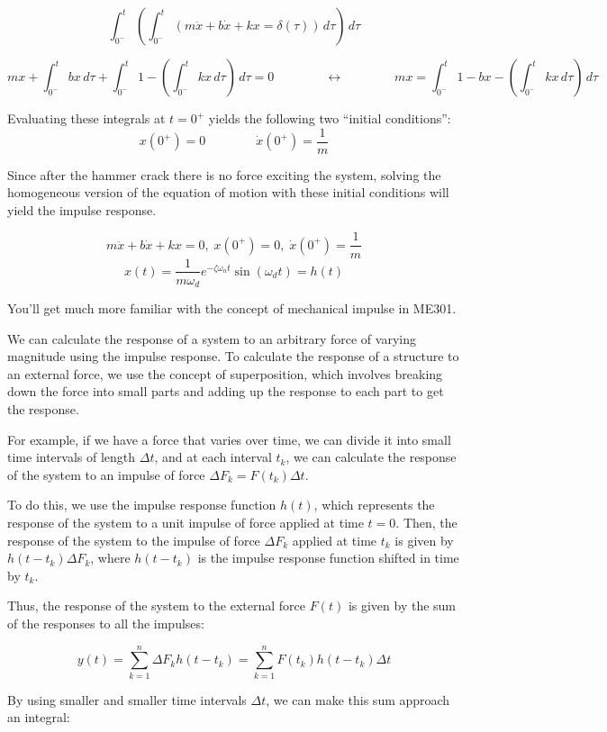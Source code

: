 \documentclass[
  letterpaper,
  DIV=11,
  numbers=noendperiod]{scrreprt}
\begin{document}
\[\int_{0^-}^t \left(\int_{0^-}^t \left(m \ddot{x} + b \dot{x} + kx = \delta(\tau) \right) \, d\tau \right) \,d\tau\]

\[m x + \int_{0^-}^t bx \, d\tau + \int_{0^-}^t 1 - \left(\int_{0^-}^t kx \, d\tau \right) \, d\tau = 0 \qquad \qquad \longleftrightarrow \qquad \qquad m x = \int_{0^-}^t 1 - bx - \left(\int_{0^-}^t kx \, d\tau \right) \, d\tau\]

Evaluating these integrals at \(t=0^+\) yields the following two
``initial conditions'':
\[x(0^+) = 0 \qquad \qquad \dot{x}(0^+) = \frac{1}{m}\]

Since after the hammer crack there is no force exciting the system,
solving the homogeneous version of the equation of motion with these
initial conditions will yield the impulse response.

\[m\ddot{x} + b\dot{x} + kx = 0 , \; x(0^+) = 0 , \;\dot{x}(0^+) = \frac{1}{m}\]
\[x(t) = \frac{1}{m \omega_d} e^{-\zeta \omega_n t} \sin(\omega_d t) = h(t)\]

You'll get much more familiar with the concept of mechanical impulse in
ME301.

We can calculate the response of a system to an arbitrary force of
varying magnitude using the impulse response. To calculate the response
of a structure to an external force, we use the concept of
superposition, which involves breaking down the force into small parts
and adding up the response to each part to get the response.

For example, if we have a force that varies over time, we can divide it
into small time intervals of length \(\Delta t\), and at each interval
\(t_k\), we can calculate the response of the system to an impulse of
force \(\Delta F_k = F(t_k)\Delta t\).

To do this, we use the impulse response function \(h(t)\), which
represents the response of the system to a unit impulse of force applied
at time \(t=0\). Then, the response of the system to the impulse of
force \(\Delta F_k\) applied at time \(t_k\) is given by
\(h(t-t_k)\Delta F_k\), where \(h(t-t_k)\) is the impulse response
function shifted in time by \(t_k\).

Thus, the response of the system to the external force \(F(t)\) is given
by the sum of the responses to all the impulses:

\[y(t) = \sum_{k=1}^n \Delta F_k h(t-t_k) = \sum_{k=1}^n  F(t_k) h(t-t_k)\Delta t\]

By using smaller and smaller time intervals \(\Delta t\), we can make
this sum approach an integral:
\end{document}
